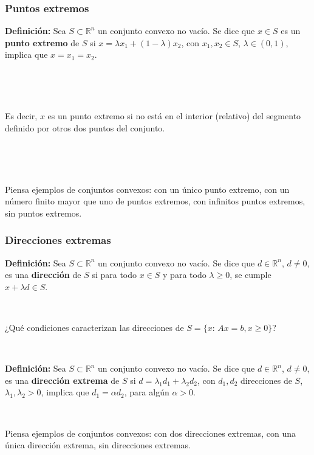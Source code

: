 \documentclass{beamer}
\begin{document}
\begin{frame}
\frametitle{Puntos extremos}

\textbf{Definición:} Sea $S\subset\mathbb{R}^n$ un conjunto convexo no vacío. Se dice que $x\in S$ es un \textbf{punto extremo} de $S$ si $x=\lambda x_1 + (1-\lambda) x_2$, con $x_1,x_2\in S$, $\lambda\in (0,1)$, implica que $x=x_1=x_2$.

\




\

Es decir, $x$ es un punto extremo si no está en el interior (relativo) del segmento definido por otros dos puntos del conjunto.

\

\

Piensa ejemplos de conjuntos convexos: con un único punto extremo, con un número finito mayor que uno de puntos extremos, con infinitos puntos extremos, sin puntos extremos.





\end{frame}
\begin{frame}
\frametitle{Direcciones extremas}


\textbf{Definición:} Sea $S\subset\mathbb{R}^n$ un conjunto convexo no vacío. Se dice que $d\in \mathbb{R}^n$, $d\neq 0$, es una \textbf{dirección} de $S$ si para todo $x\in S$ y para todo $\lambda\geq 0$, se cumple $x + \lambda d \in S$. 

\

¿Qué condiciones caracterizan las direcciones de $S=\{x:\, Ax=b, x\geq 0\}$?

\

\textbf{Definición:} Sea $S\subset\mathbb{R}^n$ un conjunto convexo no vacío. Se dice que $d\in \mathbb{R}^n$, $d\neq 0$, es una \textbf{dirección extrema } de $S$ si $d=\lambda_1 d_1 + \lambda_2 d_2$, con $d_1,d_2$ direcciones de $S$, $\lambda_1,\lambda_2 > 0$, implica que $d_1= \alpha d_2$, para algún $\alpha>0$.


\



Piensa ejemplos de conjuntos convexos: con dos direcciones extremas, con una única dirección extrema, sin direcciones extremas. 


\end{frame}
\end{document}
